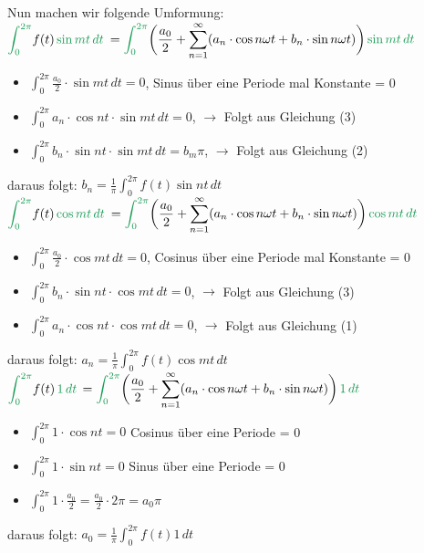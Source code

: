 \documentclass[12pt,a4paper]{article}
\newcommand{\green}[1]{\textcolor{ForestGreen} {#1}}
\newcommand{\nl}{\\[0.1cm]}
\begin{document}
Nun machen wir folgende Umformung:\nl
$\displaystyle \green{\int_0^{2\pi}} f(t)\, \green{\sin mt \, dt}$
$\displaystyle = \green{\int_0^{2\pi}} \bigg( \frac{a_0}{2} + \sum_{n=1}^\infty (a_n \cdot \cos n\omega t + b_n\cdot \sin n\omega t)\bigg)\, \green{\sin mt\, dt}$
\begin{itemize}
\item $\displaystyle \int_0^{2\pi} \frac{a_0}{2} \cdot \sin mt \, dt = 0$, \quad Sinus über eine Periode mal Konstante = 0
\item $\displaystyle \int_0^{2\pi} a_n \cdot \cos nt \cdot  \sin mt \, dt = 0$, \quad$\rightarrow$ Folgt aus Gleichung (3)
\item $\displaystyle \int_0^{2\pi} b_n \cdot \sin nt \cdot  \sin mt \, dt = b_m \pi$, \quad$\rightarrow$ Folgt aus Gleichung (2)\\
\end{itemize}
daraus folgt:
$\displaystyle b_n = \frac{1}{\pi} \int_0^{2\pi} f(t) \sin nt \, dt$\nl
$\displaystyle \green{\int_0^{2\pi}} f(t)\, \green{\cos mt \, dt}$
$\displaystyle = \green{\int_0^{2\pi}} \bigg( \frac{a_0}{2} + \sum_{n=1}^\infty (a_n \cdot \cos n\omega t + b_n\cdot \sin n\omega t)\bigg)\, \green{\cos mt\, dt}$
\begin{itemize}
\item $\displaystyle \int_0^{2\pi} \frac{a_0}{2} \cdot \cos mt \, dt = 0$, \quad Cosinus über eine Periode mal Konstante = 0
\item $\displaystyle \int_0^{2\pi} b_n \cdot \sin nt \cdot  \cos mt \, dt = 0$, \quad$\rightarrow$ Folgt aus Gleichung (3)
\item $\displaystyle \int_0^{2\pi} a_n \cdot \cos nt \cdot  \cos mt \, dt = 0$, \quad$\rightarrow$ Folgt aus Gleichung (1)
\end{itemize}
daraus folgt:
$\displaystyle a_n = \frac{1}{\pi} \int_0^{2\pi} f(t) \cos mt \, dt$\nl
$\displaystyle \green{\int_0^{2\pi}} f(t)\, \green{1 \, dt}$
$\displaystyle = \green{\int_0^{2\pi}} \bigg( \frac{a_0}{2} + \sum_{n=1}^\infty (a_n \cdot \cos n\omega t + b_n\cdot \sin n\omega t)\bigg)\, \green{1\, dt}$
\begin{itemize}
\item $\displaystyle \int_0^{2\pi} 1 \cdot \cos nt = 0$ \quad Cosinus über eine Periode = 0
\item $\displaystyle \int_0^{2\pi} 1 \cdot \sin nt = 0$ \quad Sinus über eine Periode = 0
\item $\displaystyle \int_0^{2\pi} 1 \cdot \frac{a_0}{2} = \frac{a_0}{2} \cdot 2\pi = a_0 \pi$ 
\end{itemize}
daraus folgt:
$\displaystyle a_0 = \frac{1}{\pi} \int_0^{2\pi} f(t) 1\, dt$
\end{document}

